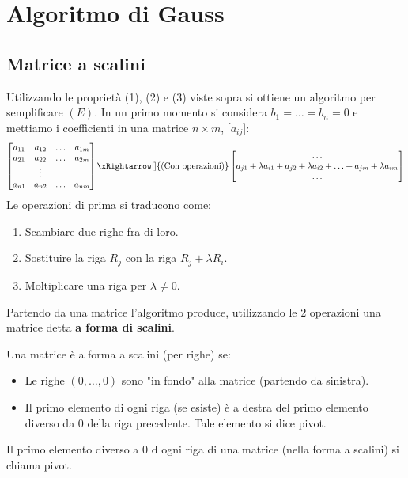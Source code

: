 \newpage
\section{Algoritmo di Gauss}
\subsection{Matrice a scalini}
Utilizzando le proprietà (1), (2) e (3) viste sopra si ottiene un algoritmo per semplificare $(E)$.
In un primo momento si considera $b_1 = \ldots = b_n = 0$ e mettiamo i coefficienti in una matrice $n \times m$, [$a_{ij}$]:
\[
\begin{bmatrix}
a_{11} & a_{12} & \ldots & a_{1m}\\
a_{21} & a_{22} & \ldots & a_{2m}\\
& \vdots & & \\
a_{n1} & a_{n2} & \ldots & a_{nm}
\end{bmatrix}
\xRightarrow[]{\text{(Con operazioni)}}
\begin{bmatrix}
\ldots \\
a_{j1} + \lambda a_{i1} + a_{j2} + \lambda a_{i2} + \ldots + a_{jm} + \lambda a_{im}\\
\ldots
\end{bmatrix}
\]
Le operazioni di prima si traducono come:
\begin{enumerate}
    \item Scambiare due righe fra di loro.
    \item Sostituire la riga $R_j$ con la riga $R_j + \lambda R_i$.
    \item Moltiplicare una riga per $\lambda \neq 0$.
\end{enumerate}
Partendo da una matrice l'algoritmo produce, utilizzando le 2 operazioni una matrice detta \textbf{a forma di scalini}.

\begin{definition}
Una matrice è a forma a scalini (per righe) se:
\begin{itemize}
    \item Le righe $(0,\ldots,0)$ sono "in fondo" alla matrice (partendo da sinistra).
    \item Il primo elemento di ogni riga (se esiste) è a destra del primo elemento diverso da 0 della riga precedente. Tale elemento si dice pivot.
\end{itemize}
\end{definition}

\begin{definition}[Pivot]
Il primo elemento diverso a 0 d ogni riga di una matrice (nella forma a scalini) si chiama pivot.
\end{definition}

